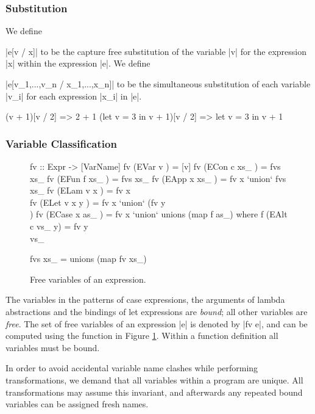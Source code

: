 \subsubsection{Substitution}

We define \ignore|e[v / x]| to be the capture free substitution of the variable |v| for the expression |x| within the expression |e|. We define \ignore|e[v_1,...,v_n / x_1,...,x_n]| to be the simultaneous substitution of each variable |v_i| for each expression |x_i| in |e|.

\begin{example}
\ignore\begin{code}
(v + 1)[v / 2]               => 2 + 1
(let v = 3 in v + 1)[v / 2]  => let v = 3 in v + 1
\end{code}
\end{example}

\subsubsection{Variable Classification}

\begin{figure}
\begin{code}
fv :: Expr -> [VarName]
fv (EVar v       ) = [v]
fv (ECon c xs_   ) = fvs xs_
fv (EFun f xs_   ) = fvs xs_
fv (EApp x xs_   ) = fv x `union` fvs xs_
fv (ELam v x     ) = fv x \\ [v]
fv (ELet v x y   ) = fv x `union` (fv y \\ [v])
fv (ECase x as_  ) = fv x `union` unions (map f as_)
    where f (EAlt c vs_ y) = fv y \\ vs_

fvs xs_ = unions (map fv xs_)
\end{code}
\caption{Free variables of an expression.}
\label{figB:free_variables}
\end{figure}

The variables in the patterns of case expressions, the arguments of lambda abstractions and the bindings of let expressions are \textit{bound}; all other variables are \textit{free}. The set of free variables of an expression |e| is denoted by |fv e|, and can be computed using the function in Figure \ref{figB:free_variables}. Within a function definition all variables must be bound.

In order to avoid accidental variable name clashes while performing transformations, we demand that all variables within a program are unique. All transformations may assume this invariant, and afterwards any repeated bound variables can be assigned fresh names.

